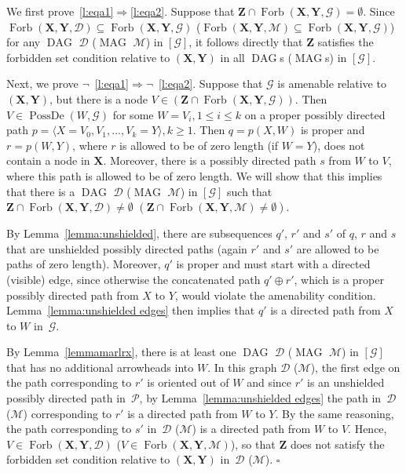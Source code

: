 \documentclass[11pt,a4paper]{article}
\newenvironment{proofof}[1][]{\begin{trivlist}
   \item[\hskip \labelsep {\bfseries Proof of #1.}]}{\hfill{}$\square$\end{trivlist}}
\DeclareMathOperator{\DAG}{DAG}
\DeclareMathOperator{\MAG}{MAG}
\DeclareMathOperator{\PossDe}{PossDe}
\DeclareMathOperator{\Forbi}{Forb}
\newcommand{\amen}{the amenability condition\xspace}
\newcommand{\forb}{the forbidden set condition\xspace}
\newcommand{\g}[1][G]{\mathcal{#1}}
\newcommand{\fb}[2][X,Y]{\Forbi(\mathbf{#1},#2)}%
\begin{document}
\begin{proofof}[Lemma~\ref{lemmaprovingeqofacconditiona}]
   We first prove~\ref{l:eqa1}$\Rightarrow$\ref{l:eqa2}. Suppose that $\mathbf{Z} \cap \fb{\g} = \emptyset$.
   Since $\fb{\g[D]} \subseteq \fb{\g}$ ($\fb{\g[M]} \subseteq \fb{\g}$) for any $\DAG$ $\g[D]$ ($\MAG$ $\g[M]$) in $[\g]$, it follows directly that $\mathbf{Z}$ satisfies \forb relative to $(\mathbf{X},\mathbf{Y})$ in all $\DAG$s ($\MAG$s) in $[\g]$.

   Next, we prove $\neg$~\ref{l:eqa1}$\Rightarrow\neg$~\ref{l:eqa2}. Suppose that $\g$ is amenable relative to $(\mathbf{X},\mathbf{Y})$, but there is a node $V \in (\mathbf{Z} \cap \fb{\g})$. Then $V \in \PossDe(W,\g)$ for some $W= V_i, 1 \le i \le k$ on a proper possibly directed path $p = \langle X=V_0, V_1,\dots, V_k=Y \rangle, k\ge 1$. Then $q=p(X,W)$ is proper and $r=p(W,Y)$, where $r$ is allowed to be of zero length (if $W=Y$), does not contain a node in $\mathbf{X}$. Moreover, there is a possibly directed path $s$ from $W$ to $V$, where this path is allowed to be of zero length. We will show that this implies that there is a $\DAG$ $\g[D]$ ($\MAG$ $\g[M]$) in $[\g]$ such that $\mathbf{Z} \cap \fb{\g[D]} \neq \emptyset$ $(\mathbf{Z} \cap \fb{\g[M]} \neq \emptyset)$.

   By Lemma~\ref{lemma:unshielded}, there are subsequences $q'$, $r'$ and $s'$ of $q$, $r$ and $s$ that are unshielded possibly directed paths (again $r'$ and $s'$ are allowed to be paths of zero length). Moreover, $q'$ is proper and must start with a directed (visible) edge, since otherwise the concatenated path $q' \oplus r'$, which is a proper possibly directed path from $X$ to $Y$, would violate \amen.
 Lemma~\ref{lemma:unshielded edges} then implies that $q'$ is a directed path from $X$ to $W$ in~$\g$.

   By Lemma~\ref{lemmamarlrx}, there is at least one $\DAG$ $\g[D]$ ($\MAG$ $\g[M]$) in  $[\g]$ that has no additional arrowheads into $W$. In this graph $\g[D]$ ($\g[M]$), the first edge on the path corresponding to $r'$ is oriented out of $W$ and since $r'$ is an unshielded possibly directed path in~$\g[P]$, by Lemma~\ref{lemma:unshielded edges} the path in~$\g[D]$ ($\g[M]$) corresponding to $r'$ is a directed path from $W$ to $Y$. By the same reasoning, the path corresponding to $s'$ in~$\g[D]$ ($\g[M]$) is a directed path from $W$ to $V$.
   Hence,  $V \in \fb{\g[D]}$  ($V \in \fb{\g[M]}$), so that $\mathbf{Z}$ does not satisfy \forb relative to $(\mathbf{X},\mathbf{Y})$ in~$\g[D]$ ($\g[M]$).
\end{proofof}
\end{document}
